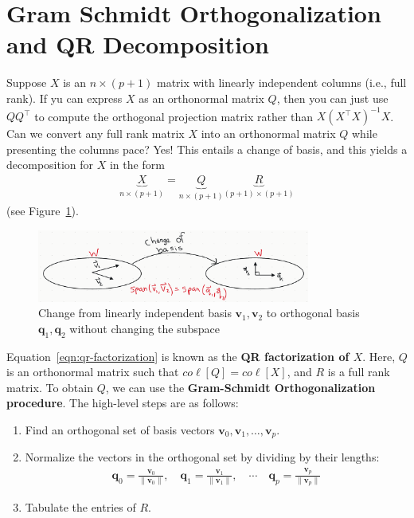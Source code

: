 \documentclass[12pt, a4paper]{article}
\theoremstyle{definition}
\begin{document}
	\section*{Gram Schmidt Orthogonalization and QR Decomposition}
	Suppose $X$ is an $n\times (p+1)$ matrix with linearly independent columns (i.e., full rank).
	If yu can express $X$ as an orthonormal matrix $Q$, then you can just use $QQ^\top$ to compute
	the orthogonal projection matrix rather than $X(X^\top X)^{-1}X$. Can we convert any full
	rank matrix $X$ into an orthonormal matrix $Q$ while presenting the columns pace? Yes!
	This entails a change of basis, and this yields a decomposition for $X$ in the form
	\begin{align}
		\label{eqn:qr-factorization}
		\underbrace{X}_{n\times (p+1)}=\underbrace{Q}_{n\times (p+1)}\underbrace{R}_{(p+1)\times(p+1)}
	\end{align}
	(see Figure~\ref{fig:change-to-ortho-basis}).
	\begin{figure}
		\centering
		\includegraphics[width=0.8\textwidth]{change-to-ortho-basis}
		\caption{Change from linearly independent basis $\mathbf{v}_1,\mathbf{v}_2$
		to orthogonal basis $\mathbf{q}_1,\mathbf{q}_2$ without changing the subspace}
		\label{fig:change-to-ortho-basis}
	\end{figure}
	Equation~\ref{eqn:qr-factorization} is known as the \textbf{QR factorization of $X$}.
	Here, $Q$ is an orthonormal matrix such that $co\ell[Q] = co\ell[X]$, and $R$ is
	a full rank matrix. To obtain $Q$, we can use the \textbf{Gram-Schmidt Orthogonalization procedure}.
	The high-level steps are as follows:
	\begin{enumerate}[label=(\roman*)]
		\item Find an orthogonal set of basis vectors $\mathbf{v}_0,\mathbf{v}_1,\ldots,\mathbf{v}_p$.
		\item Normalize the vectors in the orthogonal set by dividing by their lengths:
		\begin{align*}
			\mathbf{q}_0=\frac{\mathbf{v}_0}{\|\mathbf{v}_0\|},\quad
			\mathbf{q}_1=\frac{\mathbf{v}_1}{\|\mathbf{v}_1\|},\quad
			\cdots\quad
			\mathbf{q}_p=\frac{\mathbf{v}_p}{\|\mathbf{v}_p\|}
		\end{align*}
		\item Tabulate the entries of $R$.
	\end{enumerate}
\end{document}
